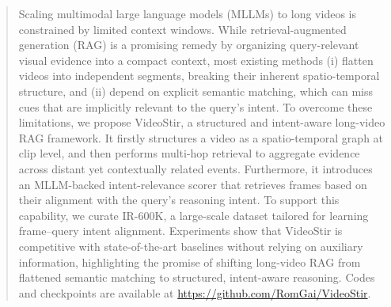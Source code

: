 \begin{abstract}

Scaling multimodal large language models (MLLMs) to long videos is constrained by limited context windows. While retrieval-augmented generation (RAG) is a promising remedy by organizing query-relevant visual evidence into a compact context, most existing methods (i) flatten videos into independent segments, breaking their inherent spatio-temporal structure, and (ii) depend on explicit semantic matching, which can miss cues that are implicitly relevant to the query’s intent. To overcome these limitations, we propose VideoStir, a structured and intent-aware long-video RAG framework. It firstly structures a video as a spatio-temporal graph at clip level, and then performs multi-hop retrieval to aggregate evidence across distant yet contextually related events. Furthermore, it introduces an MLLM-backed intent-relevance scorer that retrieves frames based on their alignment with the query’s reasoning intent. To support this capability, we curate IR-600K, a large-scale dataset tailored for learning frame–query intent alignment. Experiments show that VideoStir is competitive with state-of-the-art baselines without relying on auxiliary information, highlighting the promise of shifting long-video RAG from flattened semantic matching to structured, intent-aware reasoning. Codes and checkpoints are available at \url{https://github.com/RomGai/VideoStir}.
\end{abstract}

